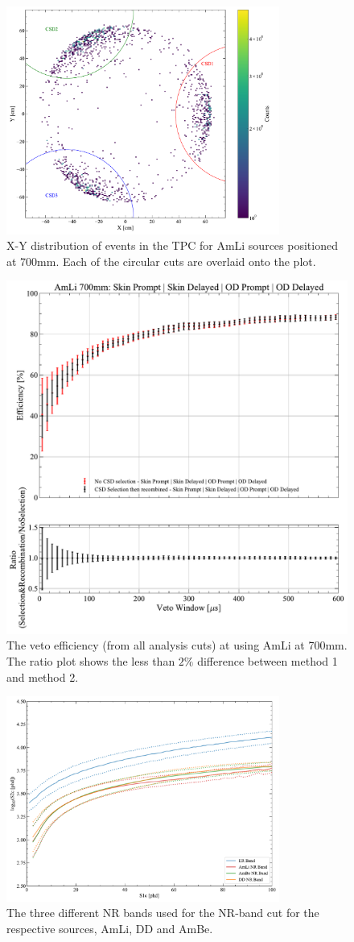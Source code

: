 \begin{figure}
	\centering
	\includegraphics[width=0.8\textwidth]{figures/VetoEfficiency/CircularCSDCut.pdf}
	\caption{X-Y distribution of events in the TPC for AmLi sources positioned at 700mm. Each of the circular cuts are overlaid onto the plot.}
	\label{fig:CSDSelection}
\end{figure}
\begin{figure}
	\centering
	\includegraphics[width=0.5\linewidth]{figures/VetoEfficiency/AmLi_700mm_Total_CSDSelection.pdf}
	\caption{The veto efficiency (from all analysis cuts) at using AmLi at 700mm. The ratio plot shows the less than $2\%$ difference between method 1 and method 2.}
	\label{fig:CSDSelectionEffComp}
\end{figure}
\begin{figure}
	\centering
	\includegraphics[width=0.8\textwidth]{figures/VetoEfficiency/SR3NRBands.pdf}
	\caption{The three different NR bands used for the NR-band cut for the respective sources, AmLi, DD and AmBe.}
	\label{fig:SR3NRBands}
\end{figure}
